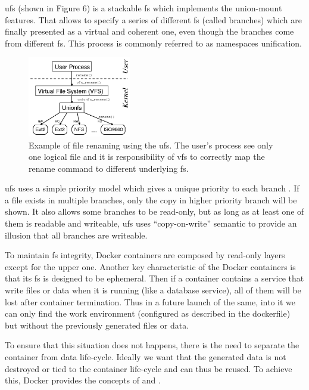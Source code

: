 \ac{ufs} (shown in Figure 6) is a stackable \ac{fs} which implements the union-mount features. That allows
to specify a series of different \ac{fs} (called branches) which are finally presented as a virtual
and coherent one, even though the branches come from different \ac{fs}. This process is commonly
referred to as namespaces unification.

\begin{figure}
	\centering{}
	\includegraphics[width=0.4\textwidth]{chapters/problem/images/unionfs.png}
	\caption[Docker \ac{ufs} overview]{Example of file renaming using the \acf{ufs}. The user's process
		see only one logical file and it is responsibility of \acf{vfs} to correctly map the rename command
		to different underlying \acf{fs}.}
	\label{img:problemSpace-docker-architecture-unionfs}
\end{figure}

\ac{ufs} uses a simple priority model which gives a unique priority to each branch . If a file exists
in multiple branches, only the copy in higher priority branch will be shown. It also allows some branches
to be read-only, but as long as at least one of them is readable and writeable, \ac{ufs} uses ``copy-on-write''
semantic to provide an illusion that all branches are writeable.

To maintain \ac{fs} integrity, Docker containers are composed by read-only layers except for the 
upper one. Another key characteristic of the Docker containers is that its \ac{fs} is designed to
be ephemeral. Then if a container contains a service that write files or data when it is running 
(like a database service), all of them will be lost after container termination. Thus in a future
launch of the same, into it we can only find the work environment (configured as described in 
the dockerfile) but without the previously generated files or data.

To ensure that this situation does not happens, there is the need to separate the container from
data life-cycle. Ideally we want that the generated data is not destroyed or tied to the container
life-cycle and can thus be reused. To achieve this, Docker provides the concepts of 
and .

